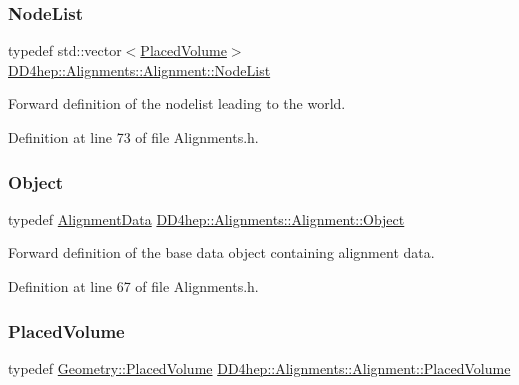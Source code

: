 \subsubsection{\texorpdfstring{Node\+List}{NodeList}}
{\footnotesize\ttfamily typedef std\+::vector$<$\hyperlink{class_d_d4hep_1_1_alignments_1_1_alignment_a69b234d416cfa4ace8a75322f2c58b66}{Placed\+Volume}$>$ \hyperlink{class_d_d4hep_1_1_alignments_1_1_alignment_a83282984664b4e1117f46d8a8bc40cb7}{D\+D4hep\+::\+Alignments\+::\+Alignment\+::\+Node\+List}}



Forward definition of the nodelist leading to the world. 



Definition at line 73 of file Alignments.\+h.

\hypertarget{class_d_d4hep_1_1_alignments_1_1_alignment_a3ed6fd0370cb7b8015d772df7ff005fc}{}\label{class_d_d4hep_1_1_alignments_1_1_alignment_a3ed6fd0370cb7b8015d772df7ff005fc} 
\subsubsection{\texorpdfstring{Object}{Object}}
{\footnotesize\ttfamily typedef \hyperlink{class_d_d4hep_1_1_alignments_1_1_alignment_data}{Alignment\+Data} \hyperlink{class_d_d4hep_1_1_alignments_1_1_alignment_a3ed6fd0370cb7b8015d772df7ff005fc}{D\+D4hep\+::\+Alignments\+::\+Alignment\+::\+Object}}



Forward definition of the base data object containing alignment data. 



Definition at line 67 of file Alignments.\+h.

\hypertarget{class_d_d4hep_1_1_alignments_1_1_alignment_a69b234d416cfa4ace8a75322f2c58b66}{}\label{class_d_d4hep_1_1_alignments_1_1_alignment_a69b234d416cfa4ace8a75322f2c58b66} 
\subsubsection{\texorpdfstring{Placed\+Volume}{PlacedVolume}}
{\footnotesize\ttfamily typedef \hyperlink{class_d_d4hep_1_1_geometry_1_1_placed_volume}{Geometry\+::\+Placed\+Volume} \hyperlink{class_d_d4hep_1_1_alignments_1_1_alignment_a69b234d416cfa4ace8a75322f2c58b66}{D\+D4hep\+::\+Alignments\+::\+Alignment\+::\+Placed\+Volume}}



